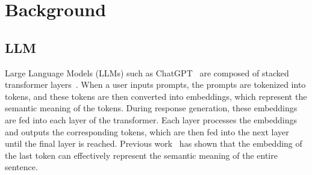 \section{Background}
\label{sec:background}
\begin{table}[tbp!]
  \centering
  \caption{Comparison of Toxic Prompt Detection Methods. \CIRCLE represents high performance, \LEFTcircle represents moderate performance, \Circle represents low performance, and $-$ represents not applicable.}
  \label{tab:limitation}
\end{table}

\subsection{LLM}
Large Language Models (LLMs) such as ChatGPT~\cite{gupta2023chatgpt} are composed of stacked transformer layers~\cite{karl2022transformers}. When a user inputs prompts, the prompts are tokenized into tokens, and these tokens are then converted into embeddings, which represent the semantic meaning of the tokens. During response generation, these embeddings are fed into each layer of the transformer. Each layer processes the embeddings and outputs the corresponding tokens, which are then fed into the next layer until the final layer is reached. Previous work~\cite{zou2023representation,zou2023universal} has shown that the embedding of the last token can effectively represent the semantic meaning of the entire sentence.






